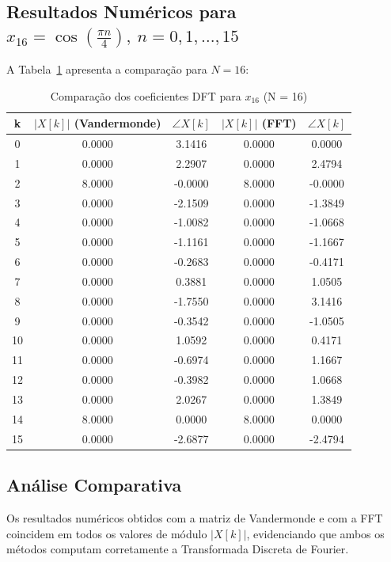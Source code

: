 \documentclass[12pt]{article}
\begin{document}
\subsection{Resultados Numéricos para $x_{16} = \cos\left(\frac{\pi n}{4}\right),\ n = 0,1,\dots,15$}

A Tabela~\ref{tab:comp16} apresenta a comparação para $N = 16$:

\begin{table}[H]
\centering
\caption{Comparação dos coeficientes DFT para $x_{16}$ (N = 16)}
\label{tab:comp16}
\begin{tabular}{c|cc|cc}
\toprule
\textbf{k} & $|X[k]|$ (Vandermonde) & $\angle X[k]$ & $|X[k]|$ (FFT) & $\angle X[k]$ \\
\midrule
0 & 0.0000 & 3.1416 & 0.0000 & 0.0000 \\
1 & 0.0000 & 2.2907 & 0.0000 & 2.4794 \\
2 & 8.0000 & -0.0000 & 8.0000 & -0.0000 \\
3 & 0.0000 & -2.1509 & 0.0000 & -1.3849 \\
4 & 0.0000 & -1.0082 & 0.0000 & -1.0668 \\
5 & 0.0000 & -1.1161 & 0.0000 & -1.1667 \\
6 & 0.0000 & -0.2683 & 0.0000 & -0.4171 \\
7 & 0.0000 & 0.3881 & 0.0000 & 1.0505 \\
8 & 0.0000 & -1.7550 & 0.0000 & 3.1416 \\
9 & 0.0000 & -0.3542 & 0.0000 & -1.0505 \\
10 & 0.0000 & 1.0592 & 0.0000 & 0.4171 \\
11 & 0.0000 & -0.6974 & 0.0000 & 1.1667 \\
12 & 0.0000 & -0.3982 & 0.0000 & 1.0668 \\
13 & 0.0000 & 2.0267 & 0.0000 & 1.3849 \\
14 & 8.0000 & 0.0000 & 8.0000 & 0.0000 \\
15 & 0.0000 & -2.6877 & 0.0000 & -2.4794 \\
\bottomrule
\end{tabular}
\end{table}

\subsection{Análise Comparativa}

Os resultados numéricos obtidos com a matriz de Vandermonde e com a FFT coincidem em todos os valores de módulo $|X[k]|$, evidenciando que ambos os métodos computam corretamente a Transformada Discreta de Fourier.
\end{document}
